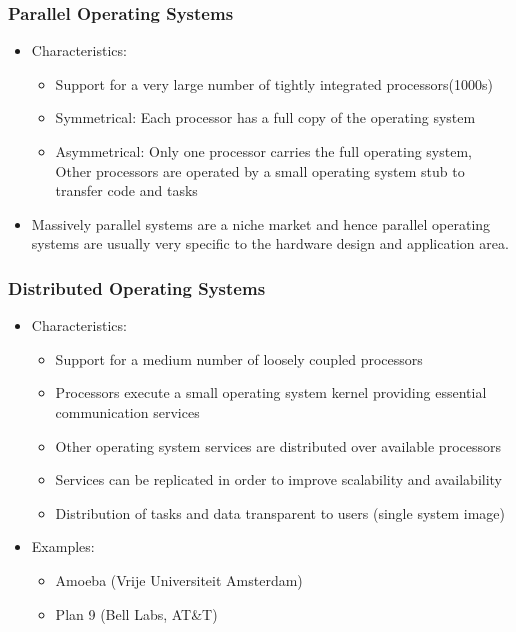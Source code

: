 \documentclass[11pt]{article}
\begin{document}
\subsubsection{Parallel Operating Systems}
\label{sec:orgc003bfb}
\begin{itemize}
\item Characteristics:
\begin{itemize}
\item Support for a very large number of tightly integrated processors(1000s)
\item Symmetrical: Each processor has a full copy of the operating system
\item Asymmetrical: Only one processor carries the full operating system, Other processors are operated by a small operating system stub to transfer code and tasks
\end{itemize}
\item Massively parallel systems are a niche market and hence parallel operating systems are usually very specific to the hardware design and application area.
\end{itemize}
\subsubsection{Distributed Operating Systems}
\label{sec:org4ce5a5a}
\begin{itemize}
\item Characteristics:
\begin{itemize}
\item Support for a medium number of loosely coupled processors
\item Processors execute a small operating system kernel providing essential communication services
\item Other operating system services are distributed over available processors
\item Services can be replicated in order to improve scalability and availability
\item Distribution of tasks and data transparent to users (single system image)
\end{itemize}
\item Examples:
\begin{itemize}
\item Amoeba (Vrije Universiteit Amsterdam)
\item Plan 9 (Bell Labs, AT\&T)
\end{itemize}
\end{itemize}
\end{document}
